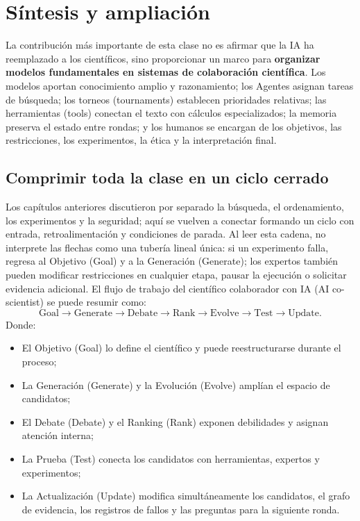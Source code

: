 \section{Síntesis y ampliación}

La contribución más importante de esta clase no es afirmar que la IA ha reemplazado a los científicos, sino proporcionar un marco para \textbf{organizar modelos fundamentales en sistemas de colaboración científica}. Los modelos aportan conocimiento amplio y razonamiento; los Agentes asignan tareas de búsqueda; los torneos (tournaments) establecen prioridades relativas; las herramientas (tools) conectan el texto con cálculos especializados; la memoria preserva el estado entre rondas; y los humanos se encargan de los objetivos, las restricciones, los experimentos, la ética y la interpretación final.

\subsection{Comprimir toda la clase en un ciclo cerrado}

Los capítulos anteriores discutieron por separado la búsqueda, el ordenamiento, los experimentos y la seguridad; aquí se vuelven a conectar formando un ciclo con entrada, retroalimentación y condiciones de parada. Al leer esta cadena, no interprete las flechas como una tubería lineal única: si un experimento falla, regresa al Objetivo (Goal) y a la Generación (Generate); los expertos también pueden modificar restricciones en cualquier etapa, pausar la ejecución o solicitar evidencia adicional. El flujo de trabajo del científico colaborador con IA (AI co-scientist) se puede resumir como:
$$
\text{Goal}
\rightarrow \text{Generate}
\rightarrow \text{Debate}
\rightarrow \text{Rank}
\rightarrow \text{Evolve}
\rightarrow \text{Test}
\rightarrow \text{Update}.
$$
Donde:
\begin{itemize}
  \item El Objetivo (Goal) lo define el científico y puede reestructurarse durante el proceso;
  \item La Generación (Generate) y la Evolución (Evolve) amplían el espacio de candidatos;
  \item El Debate (Debate) y el Ranking (Rank) exponen debilidades y asignan atención interna;
  \item La Prueba (Test) conecta los candidatos con herramientas, expertos y experimentos;
  \item La Actualización (Update) modifica simultáneamente los candidatos, el grafo de evidencia, los registros de fallos y las preguntas para la siguiente ronda.
\end{itemize}


